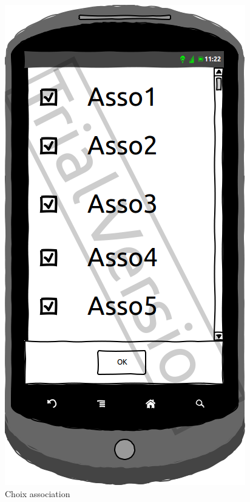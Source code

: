 \documentclass[a4paper, 11pt]{article}
\begin{document}
\begin{figure}[h!]
\begin{minipage}[c]{.33\linewidth}
\begin{center}
			\includegraphics[scale=0.3]{../../Sketch/Android/Filtre.png}
		\end{center}
	\caption{Choix association}
	\end{minipage}
	\hfill
	\begin{minipage}[c]{.32\linewidth}
		\begin{center}

\end{center}
\end{minipage}
\end{figure}
\end{document}

